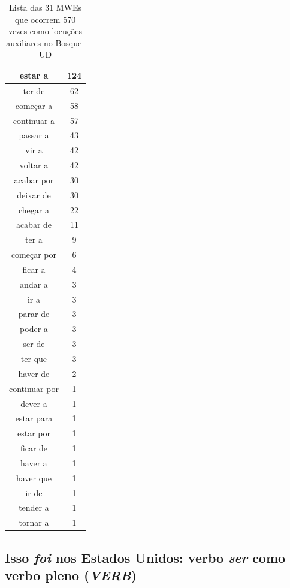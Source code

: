 \documentclass[output=paper,colorlinks,citecolor=brown]{langscibook}
\begin{document}
\begin{table}[]
{\begin{tabular}{|c|c|}
						estar a & 124\\\hline
						ter de & 62\\\hline
						começar a & 58\\\hline
						continuar a & 57\\\hline
						passar a & 43\\\hline
						vir a & 42\\\hline
						voltar a & 42\\\hline
						acabar por & 30\\\hline
						deixar de & 30\\\hline
						chegar a & 22\\\hline
						acabar de & 11\\\hline
						ter a & 9\\\hline
						começar por & 6\\\hline
						ficar a & 4\\\hline
						andar a & 3\\\hline
						ir a & 3\\\hline
						parar de & 3\\\hline
						poder a & 3\\\hline
						ser de & 3\\\hline
						ter que & 3\\\hline
						haver de & 2\\\hline
						continuar por & 1\\\hline
						dever a & 1\\\hline
						estar para & 1\\\hline
						estar por & 1\\\hline
						ficar de & 1\\\hline
						haver a & 1\\\hline
						haver que & 1\\\hline
						ir de & 1\\\hline
						tender a & 1\\\hline
						tornar a & 1\\\hline
				\end{tabular}
			}
			\caption{Lista das 31 MWEs que ocorrem 570 vezes como locuções auxiliares no Bosque-UD}
			\label{tab:auxphrasalverb}
		\end{table}


	\subsection{Isso \emph{foi} nos Estados Unidos: verbo \textit{ser} como verbo pleno (\emph{VERB})}\label{sec:serpleno}
	
\end{document}
